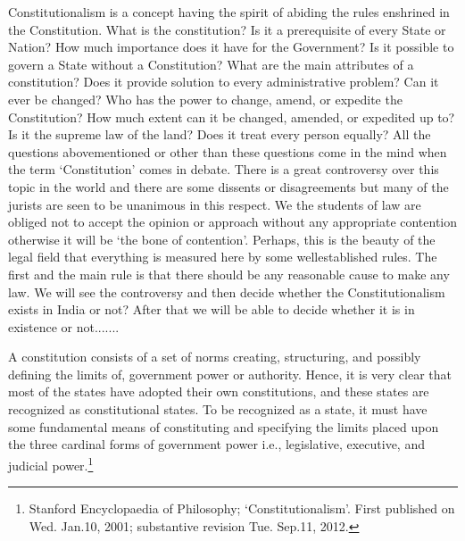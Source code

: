 \setcounter{figure}{0}
\setcounter{table}{0}
\setcounter{footnote}{0}

\label{2018-art4}

\begin{multicols}{2}


\noi
Constitutionalism is a concept having the spirit of abiding the rules enshrined in the Constitution.
What is the constitution? Is it a prerequisite of every State or Nation? How much importance does
it have for the Government? Is it possible to govern a State without a Constitution? What are the
main attributes of a constitution? Does it provide solution to every administrative problem? Can
it ever be changed? Who has the power to change, amend, or expedite the Constitution? How
much extent can it be changed, amended, or expedited up to? Is it the supreme law of the land?
Does it treat every person equally? All the questions abovementioned or other than these questions
come in the mind when the term ‘Constitution’ comes in debate. There is a great controversy over
this topic in the world and there are some dissents or disagreements but many of the jurists are
seen to be unanimous in this respect. We the students of law are obliged not to accept the opinion
or approach without any appropriate contention otherwise it will be ‘the bone of contention’.
Perhaps, this is the beauty of the legal field that everything is measured here by some wellestablished rules. The first and the main rule is that there should be any reasonable cause to make
any law. We will see the controversy and then decide whether the Constitutionalism exists in
India or not? After that we will be able to decide whether it is in existence or not.......


\noi
A constitution consists of a set of norms creating, structuring, and possibly defining the limits of,
government power or authority. Hence, it is very clear that most of the states have adopted their
own constitutions, and these states are recognized as constitutional states. To be recognized as a
state, it must have some fundamental means of constituting and specifying the limits placed upon
the three cardinal forms of government power i.e., legislative, executive, and judicial power.\footnote{Stanford Encyclopaedia of Philosophy; ‘Constitutionalism’. First published on Wed. Jan.10, 2001; substantive revision Tue. Sep.11, 2012.}


\end{multicols}
